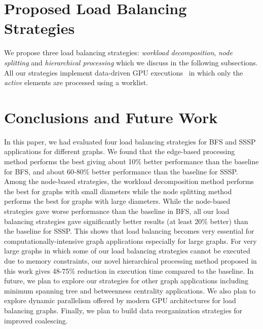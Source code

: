 \documentclass[conference,10pt]{IEEEtran}
\begin{document}
\section{Proposed Load Balancing Strategies}
\label{strategies}
We propose three load balancing strategies: \textit{workload decomposition}, \textit{node splitting} and \textit{hierarchical processing} which we discuss in the following subsections.  
All our strategies implement data-driven GPU executions~\cite{nasre-datavstoplogy-ipdps2013} in which only the \textit{active} elements are processed using a worklist.








\section{Conclusions and Future Work}
\label{con_fut}

In this paper, we had evaluated four load balancing strategies for BFS and SSSP applications for different graphs. We found that the edge-based processing method performs the best giving about 10\% better performance than the baseline for BFS, and about 60-80\% better performance than the baseline for SSSP. Among the node-based strategies, the workload decomposition method performs the best for graphs with small diameters while the node splitting method performs the best for graphs with large diameters. While the node-based strategies gave worse performance than the baseline in BFS, all our load balancing strategies gave significantly better results (at least 20\% better) than the baseline for SSSP. This shows that load balancing becomes very essential for computationally-intensive graph applications especially for large graphs.
For very large graphs in which some of our load balancing strategies cannot be executed due to memory constraints, our novel hierarchical processing method proposed in this work gives 48-75\% reduction in execution time compared to the baseline.
In future, we plan to explore our strategies for other graph applications including minimum spanning tree and betweenness centrality applications. We also plan to explore dynamic parallelism offered by modern GPU architectures for load balancing graphs. Finally, we plan to build data reorganization strategies for improved coalescing.



\end{document}
